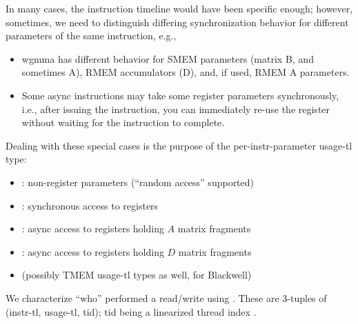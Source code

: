 In many cases, the instruction timeline would have been specific enough; however, sometimes, we need to distinguish differing synchronization behavior for different parameters of the same instruction, e.g.,
\begin{itemize}
  \item wgmma has different behavior for SMEM parameters (matrix B, and sometimes A), RMEM accumulators (D), and, if used, RMEM A parameters.
  \filbreak
  \item Some async instructions may take some register parameters synchronously, i.e., after issuing the instruction, you can immediately re-use the register without waiting for the instruction to complete.
\end{itemize}
\filbreak
Dealing with these special cases is the purpose of the per-instr-parameter usage-tl type:
\begin{itemize}
  \item {}: non-register parameters (``random access'' supported)
  \filbreak
  \item {}: synchronous access to registers
  \filbreak
  \item {}: async access to registers holding $A$ matrix fragments
  \filbreak
  \item {}: async access to registers holding $D$ matrix fragments
  \filbreak
  \item (possibly TMEM usage-tl types as well, for Blackwell)
\end{itemize}

\filbreak
{}

We characterize ``who'' performed a read/write  using .
These are 3-tuples of (instr-tl, usage-tl, tid); tid being a linearized thread index .

\filbreak
{}

